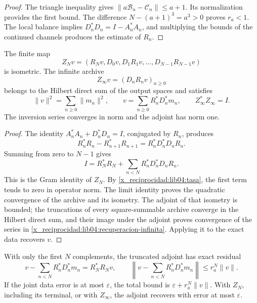\begin{proof}
The triangle inequality gives
\(\|a\mathcal B_n-\mathcal C_n\|\leq a+1\). Its normalization
provides the first bound. The difference
\(N-(a+1)^3=a^3>0\) proves \(r_a<1\). The local balance implies
\(D_n^*D_n=I-A_n^*A_n\), and multiplying the bounds of the continued
channels produces the estimate of \(R_n\).
\end{proof}

\begin{theorem}
\label{x_reciprocidad:lib04:teo-archivo}
The finite map
\begin{equation}
 Z_Nv=(R_Nv,D_0v,D_1R_1v,\ldots,D_{N-1}R_{N-1}v)
 \label{x_reciprocidad:lib04:zn}
\end{equation}
is isometric. The infinite archive
\begin{equation}
 Z_\infty v=(D_nR_nv)_{n\geq0}
 \label{x_reciprocidad:lib04:zinfty}
\end{equation}
belongs to the Hilbert direct sum of the output spaces and satisfies
\begin{equation}
 \|v\|^2=\sum_{n\geq0}\|m_n\|^2,\qquad
 v=\sum_{n\geq0}R_n^*D_n^*m_n,
 \qquad Z_\infty^*Z_\infty=I.
 \label{x_reciprocidad:lib04:recuperacion-infinita}
\end{equation}
The inversion series converges in norm and the adjoint has norm one.
\end{theorem}

\begin{proof}
The identity \(A_n^*A_n+D_n^*D_n=I\), conjugated by \(R_n\),
produces
\[
 R_n^*R_n-R_{n+1}^*R_{n+1}=R_n^*D_n^*D_nR_n.
\]
Summing from zero to \(N-1\) gives
\begin{equation}
 I=R_N^*R_N+\sum_{n<N}R_n^*D_n^*D_nR_n.
 \label{x_reciprocidad:lib04:telescopia}
\end{equation}
This is the Gram identity of \(Z_N\). By
\eqref{x_reciprocidad:lib04:tasa}, the first term tends to zero in operator
norm. The limit identity proves the quadratic convergence of the
archive and its isometry. The adjoint of that isometry is bounded; the
truncations of every square-summable archive converge in the Hilbert
direct sum, and their image under the adjoint proves convergence of the
series in \eqref{x_reciprocidad:lib04:recuperacion-infinita}. Applying it to the exact
data recovers \(v\).
\end{proof}

With only the first \(N\) complements, the truncated adjoint has
exact residual
\begin{equation}
 v-\sum_{n<N}R_n^*D_n^*m_n=R_N^*R_Nv,
 \qquad
 \left\|v-\sum_{n<N}R_n^*D_n^*m_n\right\|
 \leq r_a^N\|v\|.
 \label{x_reciprocidad:lib04:sesgo-truncado}
\end{equation}
If the joint data error is at most \(\varepsilon\), the
total bound is \(\varepsilon+r_a^N\|v\|\). With \(Z_N\), including
its terminal, or with \(Z_\infty\), the adjoint recovers with error at
most \(\varepsilon\).

